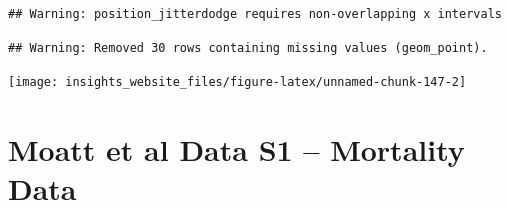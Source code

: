 \documentclass[]{book}
\newenvironment{Shaded}{\begin{snugshade}}{\end{snugshade}}
\newcommand{\DataTypeTok}[1]{\textcolor[rgb]{0.13,0.29,0.53}{#1}}
\newcommand{\DecValTok}[1]{\textcolor[rgb]{0.00,0.00,0.81}{#1}}
\newcommand{\FloatTok}[1]{\textcolor[rgb]{0.00,0.00,0.81}{#1}}
\newcommand{\KeywordTok}[1]{\textcolor[rgb]{0.13,0.29,0.53}{\textbf{#1}}}
\newcommand{\NormalTok}[1]{#1}
\newcommand{\OperatorTok}[1]{\textcolor[rgb]{0.81,0.36,0.00}{\textbf{#1}}}
\newcommand{\StringTok}[1]{\textcolor[rgb]{0.31,0.60,0.02}{#1}}
\begin{document}
\begin{Shaded}
\end{Shaded}

\begin{verbatim}
## Warning: position_jitterdodge requires non-overlapping x intervals
\end{verbatim}

\begin{verbatim}
## Warning: Removed 30 rows containing missing values (geom_point).
\end{verbatim}

\begin{center}\texttt{[image: insights\_website\_files/figure-latex/unnamed-chunk-147-2]} \end{center}

\hypertarget{moatt-et-al-data-s1-mortality-data}{%
\section{Moatt et al Data S1 -- Mortality Data}\label{moatt-et-al-data-s1-mortality-data}}
\end{document}
